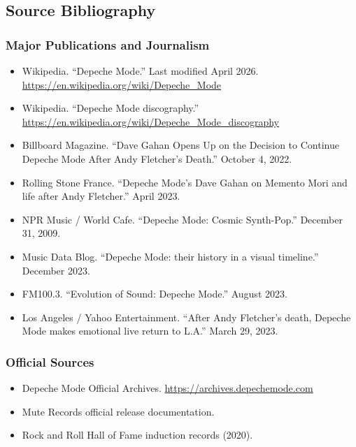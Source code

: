 \documentclass[11pt,letterpaper]{article}
\newcommand{\stageheader}[2]{%
  \noindent\colorbox{#2}{\makebox[\textwidth][l]{%
    \textcolor{white}{\bfseries\sffamily\hspace{6pt}#1\hspace{6pt}}}}%
  \vspace{0.5em}\par%
}
\begin{document}
\subsection{Source Bibliography}

\subsubsection{Major Publications and Journalism}
\begin{itemize}
  \item Wikipedia. ``Depeche Mode.'' Last modified April 2026. \url{https://en.wikipedia.org/wiki/Depeche_Mode}
  \item Wikipedia. ``Depeche Mode discography.'' \url{https://en.wikipedia.org/wiki/Depeche_Mode_discography}
  \item Billboard Magazine. ``Dave Gahan Opens Up on the Decision to Continue Depeche Mode After Andy Fletcher's Death.'' October 4, 2022.
  \item Rolling Stone France. ``Depeche Mode's Dave Gahan on Memento Mori and life after Andy Fletcher.'' April 2023.
  \item NPR Music / World Cafe. ``Depeche Mode: Cosmic Synth-Pop.'' December 31, 2009.
  \item Music Data Blog. ``Depeche Mode: their history in a visual timeline.'' December 2023.
  \item FM100.3. ``Evolution of Sound: Depeche Mode.'' August 2023.
  \item Los Angeles / Yahoo Entertainment. ``After Andy Fletcher's death, Depeche Mode makes emotional live return to L.A.'' March 29, 2023.
\end{itemize}

\subsubsection{Official Sources}
\begin{itemize}
  \item Depeche Mode Official Archives. \url{https://archives.depechemode.com}
  \item Mute Records official release documentation.
  \item Rock and Roll Hall of Fame induction records (2020).
\end{itemize}

\newpage

\stageheader{STAGE 3 --- MISSION PACKAGE}{tertiary}
\end{document}
